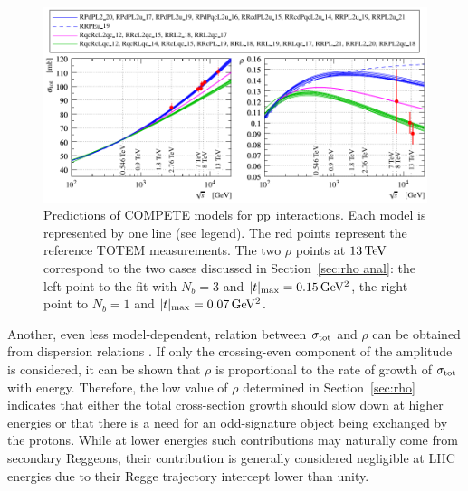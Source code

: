 \begin{figure}
\vskip-5mm
\begin{center}
\includegraphics{fig/compete_bands_si_tot_rho.pdf}
\caption{%
Predictions of COMPETE models \cite{compete-details} for $\rm pp$ interactions. Each model is represented by one line (see legend). The red points represent the reference TOTEM measurements. The two $\rho$ points at $13\,{\rm TeV}$ correspond to the two cases discussed in Section~\ref{sec:rho anal}: the left point to the fit with $N_b=3$ and $|t|_{\rm max} = 0.15\,{\rm GeV^2}$, the right point to $N_b=1$ and $|t|_{\rm max} = 0.07\,{\rm GeV^2}$.
}
\label{fig:comp bands}
\end{center}
\end{figure}

Another, even less model-dependent, relation between $\sigma_{\rm tot}$ and $\rho$ can be obtained from dispersion relations \cite{dremin-dispersion,barone-predazzi}. If only the crossing-even component of the amplitude is considered, it can be shown that $\rho$ is proportional to the rate of growth of $\sigma_{\rm tot}$ with energy. Therefore, the low value of $\rho$ determined in Section~\ref{sec:rho} indicates that either the total cross-section growth should slow down at higher energies or that there is a need for an odd-signature object being exchanged by the protons. While at lower energies such contributions may naturally come from secondary Reggeons, their contribution is generally considered negligible at LHC energies due to their Regge trajectory intercept lower than unity.

